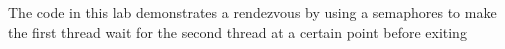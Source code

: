 The code in this lab demonstrates a rendezvous by using a semaphores to make the first thread wait for the second thread at a certain point before exiting 